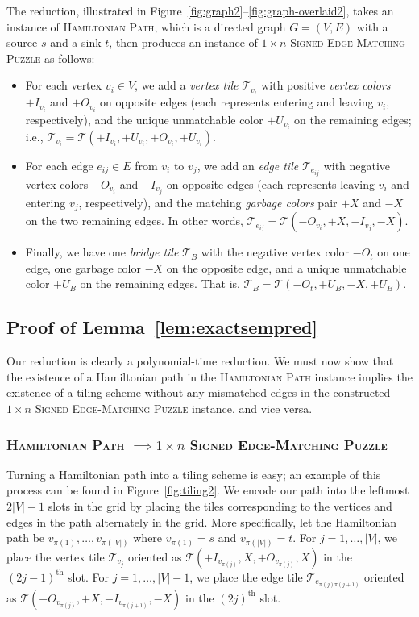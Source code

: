 \documentclass[11pt]{article}
\begin{document}
The reduction, illustrated in Figure~\ref{fig:graph2}--\ref{fig:graph-overlaid2}, takes an instance of \textsc{Hamiltonian Path}, which is a directed graph $G = (V, E)$ with a source $s$ and a sink $t$, then produces an instance of \textsc{$1 \times n$ Signed Edge-Matching Puzzle} as follows:
\begin{itemize}
	\item For each vertex $v_i \in V$, we add a \emph{vertex tile} $\mathcal{T}_{v_i}$ with positive \emph{vertex colors} $+I_{v_i}$ and $+O_{v_i}$ on opposite edges (each represents entering and leaving $v_i$, respectively), and the unique unmatchable color $+U_{v_i}$ on the remaining edges; i.e., $\mathcal{T}_{v_i} = \mathcal{T}(+I_{v_i}, +U_{v_i}, +O_{v_i}, +U_{v_i})$.
	\item For each edge $e_{ij}\in E$ from $v_i$ to $v_j$, we add an \emph{edge tile} $\mathcal{T}_{e_{ij}}$ with negative vertex colors $-O_{v_i}$ and $-I_{v_j}$ on opposite edges (each represents leaving $v_i$ and entering $v_j$, respectively), and the matching \emph{garbage colors} pair $+X$ and $-X$ on the two remaining edges. In other words, $\mathcal{T}_{e_{ij}} = \mathcal{T}(-O_{v_i}, +X, -I_{v_j}, -X)$.
	\item Finally, we have one \emph{bridge tile} $\mathcal{T}_B$ with the negative vertex color $-O_t$ on one edge, one garbage color $-X$ on the opposite edge, and a unique unmatchable color $+U_B$ on the remaining edges. That is, $\mathcal{T}_B=\mathcal{T}(-O_t,+U_B,-X,+U_B)$.
\end{itemize}

\subsection{Proof of Lemma~\ref{lem:exactsempred}} \label{sec:red-semp-proof}

Our reduction is clearly a polynomial-time reduction. We must now show that the existence of a Hamiltonian path in the \textsc{Hamiltonian Path} instance implies the existence of a tiling scheme without any mismatched edges in the constructed \textsc{$1 \times n$ Signed Edge-Matching Puzzle} instance, and vice versa.

\subsubsection*{\textsc{Hamiltonian Path} $\implies $\textsc{$1 \times n$ Signed Edge-Matching Puzzle}}

Turning a Hamiltonian path into a tiling scheme is easy; an example of this process can be found in Figure~\ref{fig:tiling2}. We encode our path into the leftmost $2|V| - 1$ slots in the grid by placing the tiles corresponding to the vertices and edges in the path alternately in the grid. More specifically, let the Hamiltonian path be $v_{\pi(1)}, \dots, v_{\pi(|V|)}$ where $v_{\pi(1)}=s$ and $v_{\pi(|V|)}=t$. For $j = 1, \dots, |V|$, we place the vertex tile $\mathcal{T}_{v_{j}}$ oriented as $\mathcal{T}(+I_{v_{\pi(j)}}, X, +O_{v_{\pi(j)}}, X)$ in the $(2j - 1)^\textrm{th}$ slot. For $j=1, \ldots, |V|-1$, we place the edge tile $\mathcal{T}_{e_{\pi(j)\pi(j+1)}}$ oriented as $\mathcal{T}(-O_{v_{\pi(j)}}, +X, -I_{v_{\pi(j+1)}}, -X)$ in the $(2j)^\textrm{th}$ slot.
\end{document}
